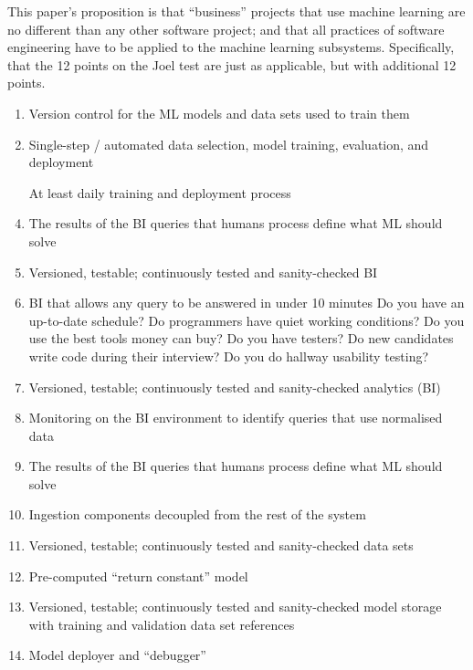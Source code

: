 This paper's proposition is that ``business'' projects that use machine learning are no different than any other software project; and that all practices of software engineering have to be applied to the machine learning subsystems. Specifically, that the 12 points on the Joel test are just as applicable, but with additional 12 points. 

\begin{enumerate}
  \item Version control for the ML models and data sets used to train them
  \item Single-step / automated data selection, model training, evaluation, and deployment
  \item [At least] daily training and deployment process
  \item The results of the BI queries that humans process define what ML should solve
  \item Versioned, testable; continuously tested and sanity-checked BI
  \item BI that allows any query to be answered in under 10 minutes
Do you have an up-to-date schedule?
Do programmers have quiet working conditions?
Do you use the best tools money can buy?
Do you have testers?
Do new candidates write code during their interview?
Do you do hallway usability testing?
  \item Versioned, testable; continuously tested and sanity-checked analytics (BI)  
  \item Monitoring on the BI environment to identify queries that use normalised data
  \item The results of the BI queries that humans process define what ML should solve
  \item Ingestion components decoupled from the rest of the system
  \item Versioned, testable; continuously tested and sanity-checked data sets 
  \label{txt:ml-code}\item Pre-computed ``return constant'' model
  \item Versioned, testable; continuously tested and sanity-checked model storage with training and validation data set references
  \item Model deployer and ``debugger''
\end{enumerate}


